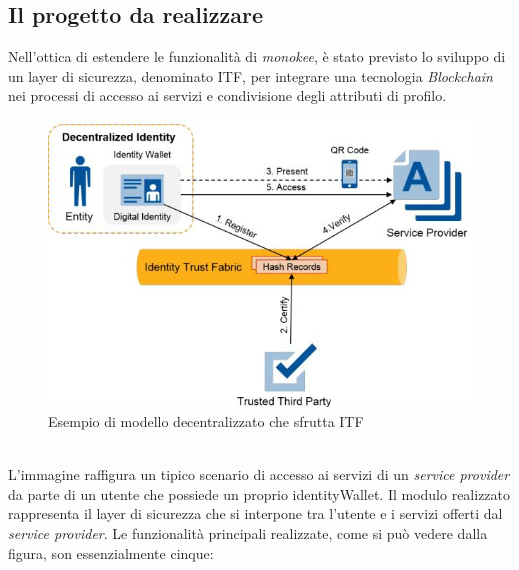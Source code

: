 \subsection{Il progetto da realizzare}
Nell'ottica di estendere le funzionalità di \emph{\gls{monokee}}\glsfirstoccur, è stato previsto lo sviluppo di un layer di sicurezza, denominato \gls{ITF}, per integrare una tecnologia \textit{Blockchain} nei processi di accesso ai servizi e condivisione degli attributi di profilo.
\begin{figure}[!h]
	\centering
	\includegraphics[scale=0.5]{immagini/ITF_Modello_Funzionale}
	\caption{Esempio di modello decentralizzato che sfrutta ITF}
	\label{fig:moduloITF}
\end{figure}
\\
L'immagine raffigura un tipico scenario di accesso ai servizi di un \textit{service provider} da parte di un utente che possiede un proprio \gls{identityWallet}.
Il modulo realizzato rappresenta il layer di sicurezza che si interpone tra l'utente e i servizi offerti dal \textit{service provider}.
Le funzionalità principali realizzate, come si può vedere dalla figura, son essenzialmente cinque:
